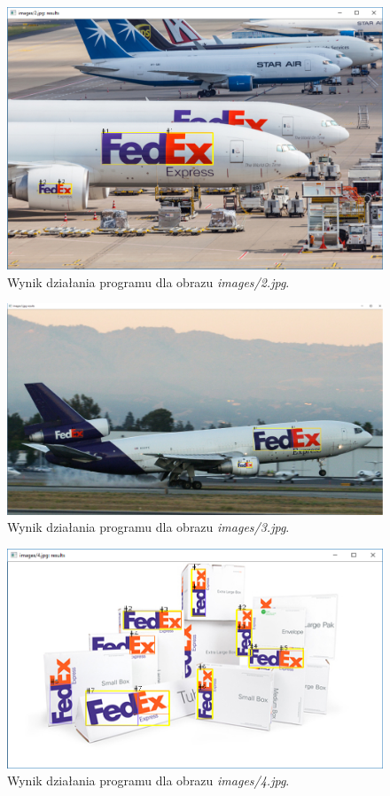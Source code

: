 \documentclass[12pt, oneside, final]{report}
\begin{document}
\begin{figure}[ht!]
	\centering
	\includegraphics[height=0.4\textheight]{images/result2.png}
	\caption{Wynik działania programu dla obrazu \textit{images/2.jpg}.}
\end{figure}
\begin{figure}[ht!]
	\centering
	\includegraphics[height=0.4\textheight]{images/result3.png}
	\caption{Wynik działania programu dla obrazu \textit{images/3.jpg}.}
\end{figure}
\begin{figure}[ht!]
	\centering
	\includegraphics[height=0.4\textheight]{images/result4.png}
	\caption{Wynik działania programu dla obrazu \textit{images/4.jpg}.}
\end{figure}
\end{document}
